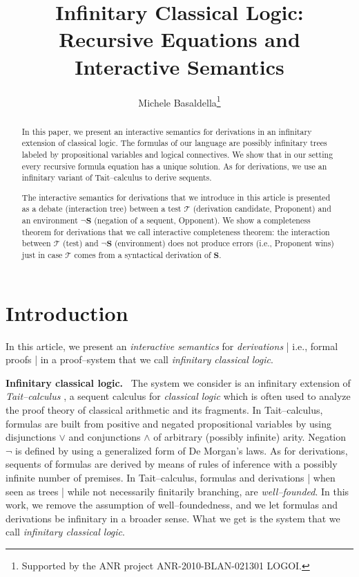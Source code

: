 \documentclass[copyright,creativecommons]{eptcs}
\title{Infinitary Classical Logic: \\  Recursive Equations and  Interactive Semantics}
\author{Michele Basaldella\thanks{Supported by the ANR project ANR-2010-BLAN-021301 LOGOI.}
\institute{Universit\'e d'Aix--Marseille, CNRS, I2M, Marseille, France}
\email{michele.basaldella@gmail.com}
}
\def\ie{i.e., }
\newcommand{\cT}{\mathcal{T}}
\newcommand{\bS}{\mathbf{S}}
\theoremstyle{definition}
\begin{document}
\maketitle

\begin{abstract}
In  this paper, we  present an interactive semantics for derivations  in an infinitary
extension of classical logic.
The formulas of our language are possibly infinitary
 trees labeled by propositional variables and logical
connectives.
We show  that in our setting
 every recursive formula equation
has a unique solution.
As for derivations, we use an infinitary variant of
 Tait--calculus to derive sequents.

 The interactive  semantics for derivations that we introduce  in this article  is  presented as a  debate (interaction tree)
between a  test $\cT$ (derivation candidate, Proponent) and
an environment   $\neg \bS$ (negation of a sequent, Opponent).
We   show a
completeness theorem for derivations that we call
interactive completeness
 theorem: the interaction between $\cT$ (test) and
 $\neg \bS$ (environment)
does not produce errors   (\ie Proponent wins)  just in case $\cT$ comes from a syntactical derivation
of  $\bS$.


\end{abstract}


\section{Introduction}

In this article, we present an \emph{interactive semantics}
for \emph{derivations} | \ie formal proofs | in a proof--system
that we call \emph{infinitary classical logic}. \\

\vspace{-0.35cm}

 \noindent \textbf{Infinitary classical logic.} \
The system we consider is an infinitary extension of
\emph{Tait--calculus} \cite{Tait68},  a  sequent calculus  for \emph{classical logic}
which is often used to analyze the proof theory of classical arithmetic and its fragments.
In Tait--calculus, formulas
are  built from positive and negated propositional variables by using
disjunctions $\vee$ and conjunctions $\wedge$
 of arbitrary (possibly infinite)
arity. Negation $\neg$ is  defined
by using a generalized form of  De Morgan's laws.
As for derivations,
sequents of formulas are derived by means of rules of
inference with a possibly infinite number of premises.
In Tait--calculus, formulas and derivations | when seen as trees |
 while not necessarily finitarily branching, are \emph{well--founded}.
In this work, we remove the assumption
of well--foundedness, and we let
formulas and derivations be
 infinitary in a broader sense. What  we get is the system that we
 call \emph{infinitary classical logic}. \\
\end{document}
